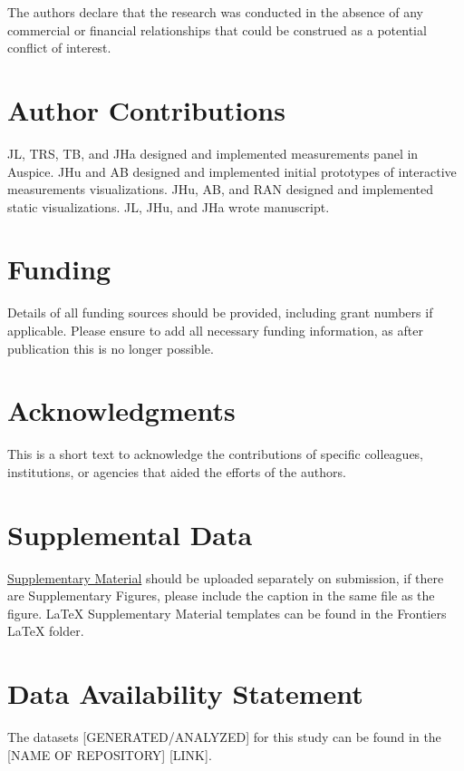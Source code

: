 \documentclass[utf8]{FrontiersinHarvard} %
\begin{document}
The authors declare that the research was conducted in the absence of any commercial or financial relationships that could be construed as a potential conflict of interest.

\section*{Author Contributions}

JL, TRS, TB, and JHa designed and implemented measurements panel in Auspice.
JHu and AB designed and implemented initial prototypes of interactive measurements visualizations.
JHu, AB, and RAN designed and implemented static visualizations.
JL, JHu, and JHa wrote manuscript.

\section*{Funding}
Details of all funding sources should be provided, including grant numbers if applicable. Please ensure to add all necessary funding information, as after publication this is no longer possible.

\section*{Acknowledgments}
This is a short text to acknowledge the contributions of specific colleagues, institutions, or agencies that aided the efforts of the authors.

\section*{Supplemental Data}
 \href{http://home.frontiersin.org/about/author-guidelines#SupplementaryMaterial}{Supplementary Material} should be uploaded separately on submission, if there are Supplementary Figures, please include the caption in the same file as the figure. LaTeX Supplementary Material templates can be found in the Frontiers LaTeX folder.

\section*{Data Availability Statement}
The datasets [GENERATED/ANALYZED] for this study can be found in the [NAME OF REPOSITORY] [LINK].



\end{document}
